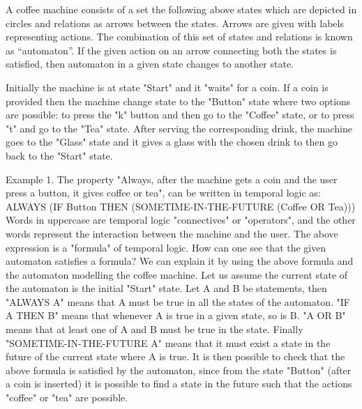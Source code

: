 \documentclass{article}
\begin{document}



A coffee machine consists of a set the following above states which are depicted in circles and relations as arrows between the states. Arrows are given with labels representing actions. The combination of this set of states and relations is known as “automaton”.  If the given action on an arrow connecting both the states is satisfied, then automaton in a given state changes to another state.



Initially the machine is at state "Start" and it "waits" for a coin. If a coin is provided then the machine change state to the "Button" state where two options are possible: to press the "k" button and then go to the "Coffee" state, or to press "t" and go to the "Tea" state. After serving the corresponding drink, the machine goes to the "Glass" state and it gives a glass with the chosen drink to then go back to the "Start" state.


Example 1.
The property "Always, after the machine gets a coin and the user press a button, it gives coffee or tea", can be written in temporal logic as:
ALWAYS (IF Button THEN (SOMETIME-IN-THE-FUTURE (Coffee OR Tea)))
Words in uppercase are temporal logic "connectives" or "operators", and the other words represent the interaction between the machine and the user. The above expression is a "formula" of temporal logic.
How can one see that the given automaton satisfies a formula? We can explain it by using the above formula and the automaton modelling the coffee machine.
Let us assume the current state of the automaton is the initial "Start" state. Let A and B be statements, then "ALWAYS A" means that A must be true in all the states of the automaton. "IF A THEN B" means that whenever A is true in a given state, so is B. "A OR B" means that at least one of A and B must be true in the state. Finally "SOMETIME-IN-THE-FUTURE A" means that it must exist a state in the future of the current state where A is true.
It is then possible to check that the above formula is satisfied by the automaton, since from the state "Button" (after a coin is inserted) it is possible to find a state in the future such that the actions "coffee" or "tea" are possible.
\end{document}
